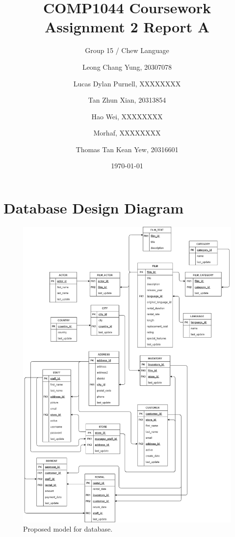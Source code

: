 \documentclass{article}
\title{COMP1044 Coursework Assignment 2 Report A}
\author{
	Group 15 / Chew Language\\
	\and
	Leong Chang Yung, 20307078
	\and
	Lucas Dylan Purnell, XXXXXXXX
	\and
	Tan Zhun Xian, 20313854
	\and
	Hao Wei, XXXXXXXX
	\and
	Morhaf, XXXXXXXX
	\and
	Thomas Tan Kean Yew, 20316601
}
\date{\today}
\begin{document}
\maketitle
\newpage
\section{Database Design Diagram}
	\begin{figure}[H]
		\includegraphics[width=\textwidth]{DBI CourseworkA}
		\caption{Proposed model for database.}	
	\end{figure}
		
\end{document}
